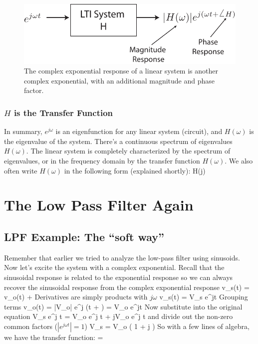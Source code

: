 \begin{figure}[tb]
\begin{center}
\includegraphics[width=.65\columnwidth]{lti_resp}
\end{center}
\caption{The complex exponential response of a linear system is another complex exponential, with an additional magnitude and phase factor. } \label{fig:lti_resp}
\end{figure}





\subsubsection{$H$ is the Transfer Function}




In summary, $e^{j\omega}$ is an eigenfunction for any linear system (circuit), and $H(\omega)$ is the eigenvalue of the system.  There's a continuous spectrum of eigenvalues $H(\omega)$.   The linear system is completely characterized by the spectrum of eigenvalues, or in the frequency domain by the transfer function $H(\omega)$.  We also often write $H(\omega)$ in the following form (explained shortly):
\be
	H(j\omega)
\ee

 



\section{The Low Pass Filter Again}




\subsection{LPF Example:  The ``soft way''}

Remember that earlier we tried to analyze the low-pass filter using sinusoids.  Now let's excite the system with a complex exponential.  Recall that the sinusoidal response is related to the exponential response so we can always recover the sinusoidal response from the complex exponential response
\be
	 v_s(t) = v_o(t) + \tau {} 
\ee
Derivatives are simply products with $j\omega$
\be 
	v_s(t) = V_s e^{j\omega t} 
\ee
Grouping terms
\be
	 v_o(t) = |V_o| e^{j (\omega t + \phi)} = V_o e^{j\omega t} 
 \ee
Now substitute into the original equation
\be 
	V_s e^{j \omega t} = V_o e^{j \omega t}  + \tau \cdot j\omega \cdot V_o e^{j \omega t} 
\ee
and divide out the non-zero common factors ($|e^{j\omega t} | = 1$)
\be 
	V_s = V_o ( 1 + j \omega \cdot \tau) 
\ee
So with a few lines of algebra, we have the transfer function:
\be {} = \ee

